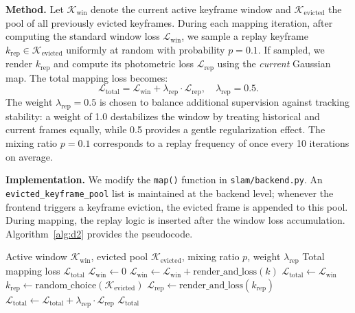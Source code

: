 \documentclass[conference]{IEEEtran}
\begin{document}
\textbf{Method.}
Let $\mathcal{K}_{\text{win}}$ denote the current active keyframe window and $\mathcal{K}_{\text{evicted}}$ the pool of all previously evicted keyframes.
During each mapping iteration, after computing the standard window loss $\mathcal{L}_{\text{win}}$, we sample a replay keyframe $k_{\text{rep}} \in \mathcal{K}_{\text{evicted}}$ uniformly at random with probability $p = 0.1$.
If sampled, we render $k_{\text{rep}}$ and compute its photometric loss $\mathcal{L}_{\text{rep}}$ using the \textit{current} Gaussian map.
The total mapping loss becomes:
\begin{equation}
\mathcal{L}_{\text{total}} = \mathcal{L}_{\text{win}} + \lambda_{\text{rep}} \cdot \mathcal{L}_{\text{rep}}, \quad \lambda_{\text{rep}} = 0.5.
\label{eq:d2}
\end{equation}
The weight $\lambda_{\text{rep}} = 0.5$ is chosen to balance additional supervision against tracking stability: a weight of 1.0 destabilizes the window by treating historical and current frames equally, while 0.5 provides a gentle regularization effect.
The mixing ratio $p=0.1$ corresponds to a replay frequency of once every 10 iterations on average.

\textbf{Implementation.}
We modify the \texttt{map()} function in \texttt{slam/backend.py}.
An \texttt{evicted\_keyframe\_pool} list is maintained at the backend level; whenever the frontend triggers a keyframe eviction, the evicted frame is appended to this pool.
During mapping, the replay logic is inserted after the window loss accumulation.
Algorithm~\ref{alg:d2} provides the pseudocode.

\begin{algorithm}[t]
\caption{Historical Keyframe Replay in Mapping}
\label{alg:d2}
\begin{algorithmic}
\REQUIRE Active window $\mathcal{K}_{\text{win}}$, evicted pool $\mathcal{K}_{\text{evicted}}$, mixing ratio $p$, weight $\lambda_{\text{rep}}$
\ENSURE Total mapping loss $\mathcal{L}_{\text{total}}$
\STATE $\mathcal{L}_{\text{win}} \gets 0$
    \STATE $\mathcal{L}_{\text{win}} \gets \mathcal{L}_{\text{win}} + \text{render\_and\_loss}(k)$
\ENDFOR
\STATE $\mathcal{L}_{\text{total}} \gets \mathcal{L}_{\text{win}}$
    \STATE $k_{\text{rep}} \gets \text{random\_choice}(\mathcal{K}_{\text{evicted}})$
    \STATE $\mathcal{L}_{\text{rep}} \gets \text{render\_and\_loss}(k_{\text{rep}})$
    \STATE $\mathcal{L}_{\text{total}} \gets \mathcal{L}_{\text{total}} + \lambda_{\text{rep}} \cdot \mathcal{L}_{\text{rep}}$
\ENDIF
\STATE \RETURN $\mathcal{L}_{\text{total}}$
\end{algorithmic}
\end{algorithm}
\end{document}

